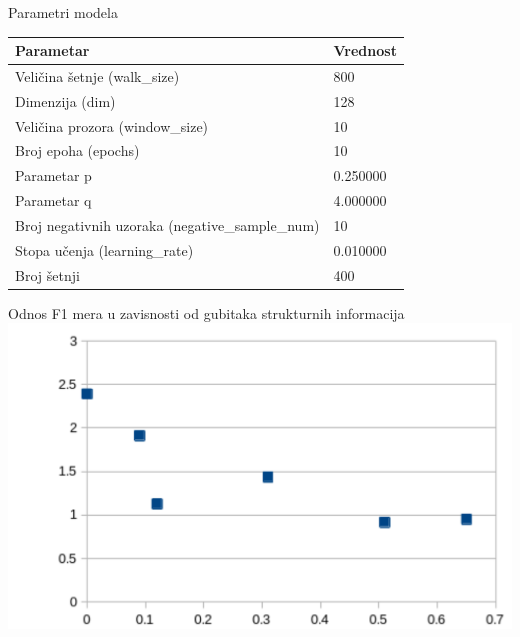 \documentclass{beamer}
\begin{document}
\begin{frame}{Parametri modela}
    \centering
    \begin{table}
        \label{tab:4.12}
        \begin{tabular}{p{2in}p{2in}}
        \hline
        Parametar & Vrednost \\
        \hline
        Veličina šetnje (walk\_size) & 800 \\
        Dimenzija (dim) & 128 \\
        Veličina prozora (window\_size) & 10 \\
        Broj epoha (epochs) & 10 \\
        Parametar p & 0.250000 \\
        Parametar q & 4.000000 \\
        Broj negativnih uzoraka (negative\_sample\_num) & 10 \\
        Stopa učenja (learning\_rate) & 0.010000 \\
        Broj šetnji & 400 \\
        \hline
    \end{tabular}
\end{table}
\end{frame}


\begin{frame}{Odnos F1 mera u zavisnosti od gubitaka strukturnih informacija}
    \includegraphics[height=0.8\textheight]{png/grafik.png}
\end{frame}
\end{document}
